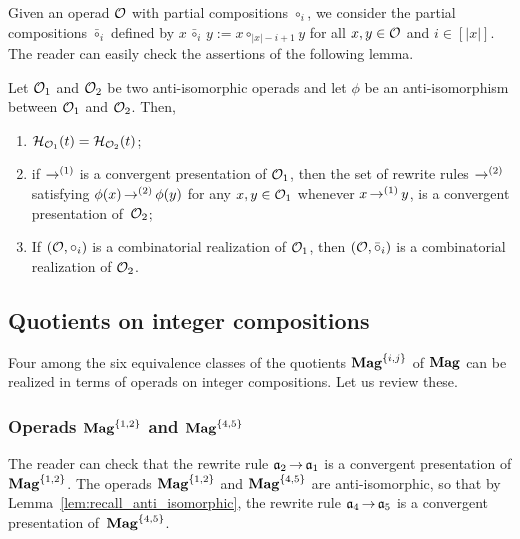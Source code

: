 Given an operad $\mathcal{O}$ with partial compositions $\circ_i$, we consider
the partial compositions $\bar{\circ}_i$ defined by
\begin{math}
  x \, \bar{\circ}_i \, y := x \circ_{|x| - i + 1} y
\end{math}
for all $x, y \in \mathcal{O}$ and $i \in [|x|]$. The reader can easily check
the assertions of the following lemma.
\medbreak

\begin{Lemma} \label{lem:recall_anti_isomorphic}
    Let $\mathcal{O}_1$ and $\mathcal{O}_2$ be two anti-isomorphic operads and let
    $\phi$ be an anti-isomorphism between $\mathcal{O}_1$ and $\mathcal{O}_2$. Then,
    \begin{enumerate}[label={(\it\roman*)}]
        \item \label{item:recall_anti_isomorphic_1}
        $\mathcal{H}_{\mathcal{O}_1}(t) = \mathcal{H}_{\mathcal{O}_2}(t)$;
        \item \label{item:recall_anti_isomorphic_2}
        if $\operatorname{\to}^{(1)}$ is a convergent presentation of $\mathcal{O}_1$, then
        the set of rewrite rules $\operatorname{\to}^{(2)}$ satisfying
        $\phi(x) \operatorname{\to}^{(2)} \phi(y)$ for any $x, y \in \mathcal{O}_1$ whenever
        $x \operatorname{\to}^{(1)} y$, is a convergent presentation of~$\mathcal{O}_2$;
        \item\label{item:realization_anti_isomorphic}
        If $\left(\mathcal{O}, \circ_i\right)$ is a combinatorial realization
        of $\mathcal{O}_1$, then
        \begin{math}
          \left(\mathcal{O}, \bar{\circ}_i\right)
        \end{math}
        is a combinatorial realization of $\mathcal{O}_2$.
    \end{enumerate}
\end{Lemma}
\medbreak

\subsection{Quotients on integer compositions}
Four among the six equivalence classes of the quotients
$\mathbf{Mag}^{\{i, j\}}$ of $\mathbf{Mag}$ can be realized in terms of operads on
integer compositions. Let us review these.
\medbreak

\subsubsection{Operads $\mathbf{Mag}^{\{1, 2\}}$ and $\mathbf{Mag}^{\{4, 5\}}$}
\label{subsubsec:Mag_1_2}
The reader can check that the rewrite rule $\mathfrak{a}_2 \operatorname{\to} \mathfrak{a}_1$ is a
convergent presentation of $\mathbf{Mag}^{\{1, 2\}}$. The operads
$\mathbf{Mag}^{\{1, 2\}}$ and $\mathbf{Mag}^{\{4, 5\}}$ are anti-isomorphic, so that
by Lemma~\ref{lem:recall_anti_isomorphic}, the rewrite rule
$\mathfrak{a}_4 \operatorname{\to} \mathfrak{a}_5$ is a convergent presentation of~$\mathbf{Mag}^{\{4, 5\}}$.
\medbreak

